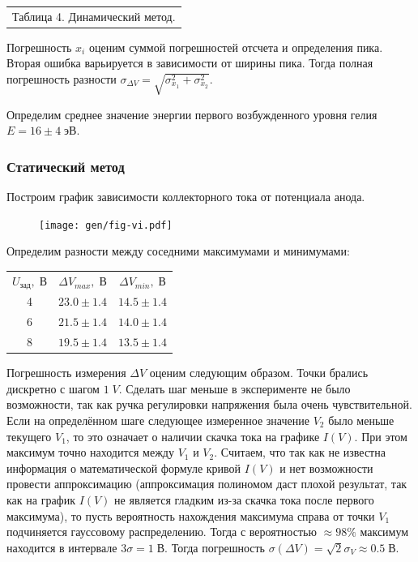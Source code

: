 \documentclass[10pt,a4paper]{article}
\newcommand{\V}{\; В}
\begin{document}
	\begin{center}
		\begin{tabular}[t]{c}
			Таблица 4. Динамический метод. \\
			
		\end{tabular}
	\end{center}


	Погрешность $x_i$ оценим суммой погрешностей отсчета и определения пика. Вторая ошибка варьируется в зависимости от ширины пика. Тогда полная погрешность разности $\sigma_{\Delta V} = \sqrt{\sigma_{x_1}^2 + \sigma_{x_2}^2} $.
	
	Определим среднее значение энергии первого возбужденного уровня гелия $E = 16 \pm 4 \; эВ$. 
	
	\subsubsection*{Статический метод}
	
	Построим график зависимости коллекторного тока от потенциала анода.
	
	\begin{figure}[h]
		\centering
		\texttt{[image: gen/fig-vi.pdf]}		
	\end{figure}
	
	Определим разности между соседними максимумами и минимумами: \\
	\begin{center}
		\begin{tabular}{|c|c|c|}
			$U_{зад}, \V$ & $\Delta V_{max}, \V$ & $\Delta V_{min}, \V$ \\
			4 & $23.0 \pm 1.4$ & $14.5 \pm 1.4$ \\
			6 & $21.5 \pm 1.4$ & $14.0 \pm 1.4$ \\
			8 & $19.5 \pm 1.4$ & $13.5 \pm 1.4$ \\
		\end{tabular}
	\end{center}

	
	Погрешность измерения $\Delta V$ оценим следующим образом. Точки брались дискретно с шагом $1 \; V$. Сделать шаг меньше в эксперименте не было возможности, так как ручка регулировки напряжения была очень чувствительной. Если на определённом шаге следующее измеренное значение $V_2$ было меньше текущего $V_1$, то это означает о наличии скачка тока на графике $I(V)$. При этом максимум точно находится между $V_1$ и $V_2$. Считаем, что так как не известна информация о математической формуле кривой $I(V)$ и нет возможности провести аппроксимацию (аппроксимация полиномом даст плохой результат, так как на график $I(V)$ не является гладким из-за скачка тока после первого максимума), то пусть вероятность нахождения максимума справа от точки $V_1$ подчиняется гауссовому распределению. Тогда с вероятностью $\approx 98 \%$ максимум находится в интервале $3\sigma = 1 \V$. Тогда погрешность $\sigma(\Delta V) = \sqrt{2} \sigma_V \approx 0.5 \V$.
	
\end{document}
